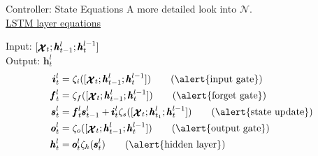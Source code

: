\documentclass{beamer}
\newcommand{\xx}{\pmb{\raisebox{-1.5pt}{$\mathcal{X}$}}}
\newcommand{\hh}{\pmb{h}}
\newcommand{\ii}{\pmb{i}}
\newcommand{\oo}{\pmb{o}}
\newcommand{\ff}{\pmb{f}}
\newcommand{\Ss}{\pmb{s}}
\newcommand{\bb}{\pmb{b}}
\newenvironment{rcases}
  {\left.\begin{aligned}}
  {\end{aligned}\right\rbrace}
\begin{document}
\begin{frame}{Controller: State Equations}
	A more detailed look into $\mathcal{N}$.\\	
	
	
	\pause		
	\underline{\alert{LSTM layer equations}}

	\alert{Input}: $[\xx_t;\hh_{t-1}^l;\hh_t^{l-1}]$ \\
	\alert{Output}: $\hh_t^l$
	\pause
	\begin{align}
	\ii_t^l &= \zeta_i([\xx_t;\hh_{t-1}^l;\hh_t^{l-1}]) \tag{\alert{input gate}}\\
	\ff_t^l &= \zeta_f([\xx_t;\hh_{t-1}^l;\hh_t^{l-1}])	\tag{\alert{forget gate}}\\
	\Ss_t^l &= \ff_t^l\Ss_{t-1}^l + \ii_t^l\zeta_s([\xx_t;\hh_{t_1}^l;\hh_t^{l-1}]) \tag{\alert{state update}}\\
	\oo_t^l &= \zeta_o([\xx_t;\hh_{t-1}^l;\hh_t^{l-1}])	\tag{\alert{output gate}}\\
	\hh_t^l &= \oo_t^l\zeta_h(\Ss_t^l)		\tag{\alert{hidden layer}}
	\end{align}
\end{frame}
\end{document}
